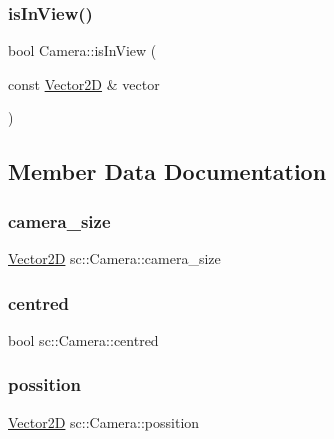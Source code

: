 \mbox{\label{classsc_1_1_camera_a6b737853f54514a30700f4ff27433995}} 
\subsubsection{\texorpdfstring{isInView()}{isInView()}}
{\footnotesize\ttfamily bool Camera\+::is\+In\+View (\begin{DoxyParamCaption}\item[{const \mbox{\hyperlink{classsc_1_1_vector2_d}{Vector2D}} \&}]{vector }\end{DoxyParamCaption})}



\subsection{Member Data Documentation}
\mbox{\label{classsc_1_1_camera_a1f87bf4e63d05ca2e86ac4acf4d01671}} 
\subsubsection{\texorpdfstring{camera\_size}{camera\_size}}
{\footnotesize\ttfamily \mbox{\hyperlink{classsc_1_1_vector2_d}{Vector2D}} sc\+::\+Camera\+::camera\+\_\+size}

\mbox{\label{classsc_1_1_camera_a2d6647a30a10807d10d75a165b73b844}} 
\subsubsection{\texorpdfstring{centred}{centred}}
{\footnotesize\ttfamily bool sc\+::\+Camera\+::centred}

\mbox{\label{classsc_1_1_camera_a521be7f945f1d565e766162f39aa99ab}} 
\subsubsection{\texorpdfstring{possition}{possition}}
{\footnotesize\ttfamily \mbox{\hyperlink{classsc_1_1_vector2_d}{Vector2D}} sc\+::\+Camera\+::possition}



